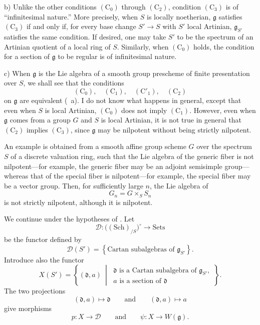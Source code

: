 \smallskip
\noindent
\textup{b)}
Unlike the other conditions \((\mathrm C_0)\) through
\((\mathrm C_2)\), condition \((\mathrm C_3)\) is of
``infinitesimal nature.'' More precisely, when \(S\) is locally
noetherian, \(\mathfrak g\) satisfies \((\mathrm C_3)\) if and only
if, for every base change \(S'\to S\) with \(S'\) local Artinian,
\(\mathfrak g_{S'}\) satisfies the same condition. If desired, one
may take \(S'\) to be the spectrum of an Artinian quotient of a
local ring of \(S\). Similarly, when \((\mathrm C_0)\) holds, the
condition for a section of \(\mathfrak g\) to be regular is of
infinitesimal nature.

\smallskip
\noindent
\textup{c)}
When \(\mathfrak g\) is the Lie algebra of a smooth group
prescheme of finite presentation over \(S\), we shall see that the
conditions
\[
  (\mathrm C_0),\quad(\mathrm C_1),\quad
  (\mathrm C'_1),\quad(\mathrm C_2)
\]
on \(\mathfrak g\) are equivalent \textup{(~a)}. I do not know
what happens in general, except that even when \(S\) is local
Artinian, \((\mathrm C_0)\) does not imply \((\mathrm C_1)\).
However, even when \(\mathfrak g\) comes from a group \(G\) and
\(S\) is local Artinian, it is not true in general that
\((\mathrm C_2)\) implies \((\mathrm C_3)\), since
\(\mathfrak g\) may be nilpotent without being strictly
nilpotent.

An example is obtained from a smooth affine group scheme \(G\)
over the spectrum \(S\) of a discrete valuation ring, such that
the Lie algebra of the generic fiber is not nilpotent---for
example, the generic fiber may be an adjoint semisimple
group---whereas that of the special fiber is nilpotent---for
example, the special fiber may be a vector group. Then, for
sufficiently large \(n\), the Lie algebra of
\[
  G_n=G\times_S S_n
\]
is not strictly nilpotent, although it is nilpotent.



We continue under the hypotheses of . Let
\[
  \mathcal D\colon
  \bigl((\mathrm{Sch})_{/S}\bigr)^\circ
  \longrightarrow \mathrm{Sets}
\]
be the functor defined by
\[
  \mathcal D(S')
  =\left\{
    \text{Cartan subalgebras of }\mathfrak g_{S'}
   \right\}.
\]
Introduce also the functor
\[
  X(S')
  =\left\{
    (\mathfrak d,a)\ \middle|\
    \begin{array}{l}
      \mathfrak d\text{ is a Cartan subalgebra of }\mathfrak g_{S'},\\
      a\text{ is a section of }\mathfrak d
    \end{array}
   \right\}.
\]
The two projections
\[
  (\mathfrak d,a)\longmapsto\mathfrak d
  \qquad\text{and}\qquad
  (\mathfrak d,a)\longmapsto a
\]
give morphisms
\[
  p\colon X\longrightarrow\mathcal D
  \qquad\text{and}\qquad
  \psi\colon X\longrightarrow W(\mathfrak g).
\]

